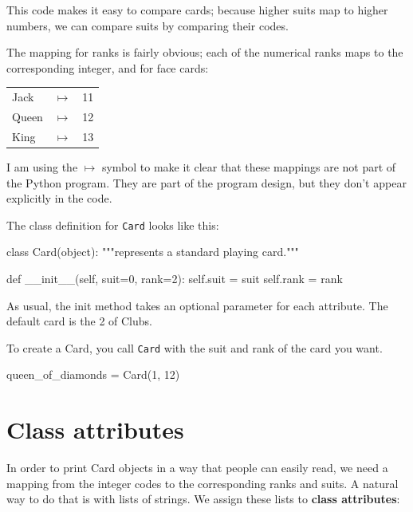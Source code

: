 This code makes it easy to compare cards; because higher suits map to
higher numbers, we can compare suits by comparing their codes.

The mapping for ranks is fairly obvious; each of the numerical ranks
maps to the corresponding integer, and for face cards:

\beforefig
\begin{tabular}{l c l}
Jack & $\mapsto$ & 11 \\
Queen & $\mapsto$ & 12 \\
King & $\mapsto$ & 13 \\
\end{tabular}
\afterfig

I am using the $\mapsto$ symbol to make it clear that these mappings
are not part of the Python program.  They are part of the program
design, but they don't appear explicitly in the code.


The class definition for {\tt Card} looks like this:

\beforeverb
\begin{pycode}
class Card(object):
    """represents a standard playing card."""

    def __init__(self, suit=0, rank=2):
        self.suit = suit
        self.rank = rank
\end{pycode}
\afterverb
%
As usual, the init method takes an optional
parameter for each attribute.  The default card is
the 2 of Clubs.


To create a Card, you call {\tt Card} with the
suit and rank of the card you want.

\beforeverb
\begin{pycode}
queen_of_diamonds = Card(1, 12)
\end{pycode}
\afterverb
%


\section{Class attributes}


In order to print Card objects in a way that people can easily
read, we need a mapping from the integer codes to the corresponding
ranks and suits.  A natural way to
do that is with lists of strings.  We assign these lists to {\bf class
attributes}:

